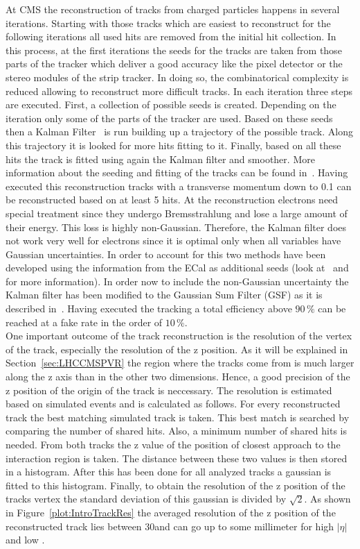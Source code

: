 At CMS the reconstruction of tracks from charged particles happens in several iterations. Starting with those tracks which are easiest to reconstruct for the following iterations all used hits are removed from the initial hit collection. In this process, at the first iterations the seeds for the tracks are taken from those parts of the tracker which deliver a good accuracy like the pixel detector or the stereo modules of the strip tracker. In doing so, the combinatorical complexity is reduced allowing to reconstruct more difficult tracks. In each iteration three steps are executed. First, a collection of possible seeds is created. Depending on the iteration only some of the parts of the tracker are used. Based on these seeds then a Kalman Filter~\cite{Fruhwirth:1987fm} is run building up a trajectory of the possible track. Along this trajectory it is looked for more hits fitting to it. Finally, based on all these hits the track is fitted using again the Kalman filter and smoother. More information about the seeding and fitting of the tracks can be found in~. Having executed this reconstruction tracks with a transverse momentum down to 0.1\GeVc{} can be reconstructed based on at least 5 hits. At the reconstruction electrons need special treatment since they undergo Bremsstrahlung and lose a large amount of their energy. This loss is highly non-Gaussian. Therefore, the Kalman filter does not work very well for electrons since it is optimal only when all variables have Gaussian uncertainties. In order to account for this two methods have been developed using the information from the ECal as additional seeds (look at~ and~ for more information). In order now to include the non-Gaussian uncertainty the Kalman filter has been modified to the Gaussian Sum Filter (GSF) as it is described in~. Having executed the tracking a total efficiency above $90\,\%$ can be reached at a fake rate in the order of $10\,\%$. \\
One important outcome of the track reconstruction is the resolution of the vertex of the track, especially the resolution of the z position. As it will be explained in Section~\ref{sec:LHCCMSPVR} the region where the tracks come from is much larger along the z axis than in the other two dimensions. Hence, a good precision of the z position of the origin of the track is neccessary. The resolution is estimated based on simulated events and is calculated as follows. For every reconstructed track the best matching simulated track is taken. This best match is searched by comparing the number of shared hits. Also, a minimum number of shared hits is needed. From both tracks the z value of the position of closest approach to the interaction region is taken. The distance between these two values is then stored in a histogram. After this has been done for all analyzed tracks a gaussian is fitted to this histogram. Finally, to obtain the resolution of the z position of the tracks vertex the standard deviation of this gaussian is divided by $\sqrt{2}$.  As shown in Figure~\ref{plot:IntroTrackRes} the averaged resolution of the z position of the reconstructed track lies between 30\mum and can go up to some millimeter for high $\left|\eta\right|$ and low \pt{}.


